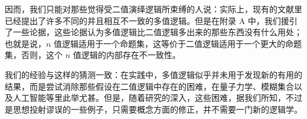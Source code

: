 因而，我们只能对那些觉得受二值演绎逻辑所束缚的人说：实际上，现有的文献里已经提出了许多不同的并且相互不一致的多值逻辑。但是在附录 A 中，我们援引了一些论据，这些论据认为多值逻辑比二值逻辑多出来的那些东西没有什么用处；也就是说，$n$ 值逻辑适用于一个命题集，这等价于二值逻辑适用于一个更大的命题集，否则，这个 $n$ 值逻辑的内部存在不一致性。

我们的经验与这样的猜测一致：在实践中，多值逻辑似乎并未用于发现新的有用的结果，而是尝试消除那些假设在二值逻辑中存在的困难，在量子力学、模糊集合以及人工智能等里此举尤甚。但是，随着研究的深入，这些困难，据我们所知，不过是思想投射谬误的一些例子，只需要概念方面的修正，并不需要一门新的逻辑学。